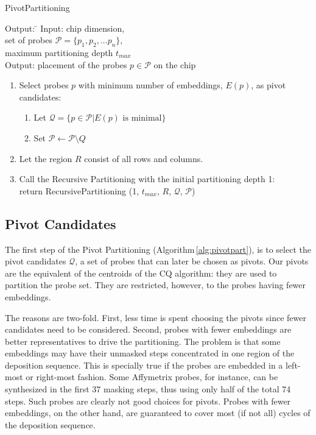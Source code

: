 \documentclass{llncs}
\begin{document}
\begin{algorithm}
\caption{PivotPartitioning}
\label{alg:pivotpart}
\begin{minipage}{4.8in}

\begin{tabbing}
Output: \=                                  \kill
Input:  \> chip dimension,                          \\
        \> set of probes $\mathcal{P} = \{p_{1}, p_{2}, ... p_{n}\}$,       \\
        \> maximum partitioning depth $t_{max}$                 \\
Output: \> placement of the probes $p \in \mathcal{P}$ on the chip
\end{tabbing}

\begin{enumerate}
\item Select probes $p$ with minimum number of embeddings, $E(p)$,
as pivot candidates:
  \begin{enumerate}
  \item Let $\mathcal{Q} = \{p \in \mathcal{P} | E(p) \mbox{ is minimal}\}$
  \item Set $\mathcal{P} \leftarrow \mathcal{P} \setminus Q$
  \end{enumerate}
\item Let the region $R$ consist of all rows and columns.
\item Call the Recursive Partitioning with the initial partitioning depth 1:\\
  return RecursivePartitioning (1, $t_{max}$, $R$, $\mathcal{Q}$, $\mathcal{P}$)
\end{enumerate}
\end{minipage}
\end{algorithm}

\subsection{Pivot Candidates}

The first step of the Pivot Partitioning (Algorithm\,\ref{alg:pivotpart}), is
to select the pivot candidates $\mathcal{Q}$, a set of probes that can later
be chosen as pivots. Our pivots are the equivalent of the centroids of the CQ
algorithm: they are used to partition the probe set. They are restricted,
however, to the probes having fewer embeddings.

The reasons are two-fold. First, less time is spent choosing the pivots since
fewer candidates need to be considered.  Second, probes with fewer embeddings
are better representatives to drive the partitioning. The problem is that some
embeddings may have their unmasked steps concentrated in one region of the
deposition sequence. This is specially true if the probes are embedded in a
left-most or right-most fashion.  Some Affymetrix probes, for instance, can be
synthesized in the first 37 masking steps, thus using only half of the total
74 steps. Such probes are clearly not good choices for pivots. Probes with
fewer embeddings, on the other hand, are guaranteed to cover most (if not all)
cycles of the deposition sequence.
\end{document}
